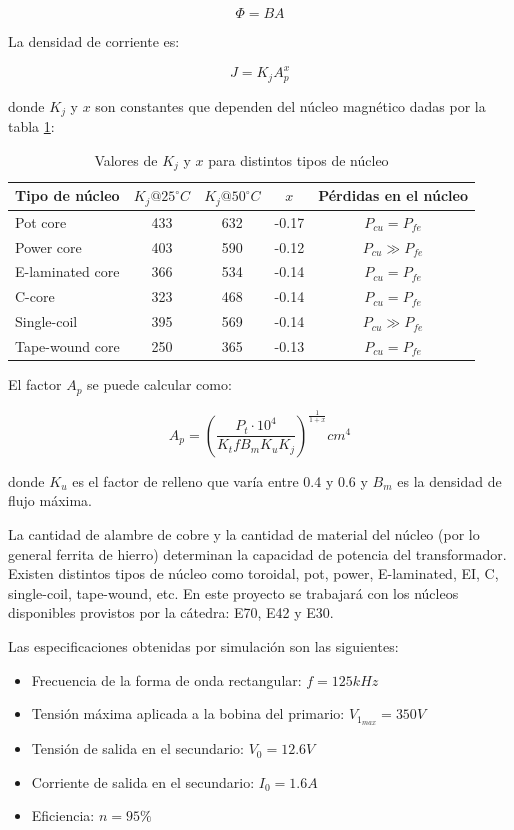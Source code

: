 $$ \Phi=BA $$

La densidad de corriente es:

$$ J=K_jA_p^x $$

donde $K_j$ y $x$ son constantes que dependen del núcleo magnético dadas por la tabla \ref{tabla:Kj}:

\begin{table}[]
    \begin{tabular}{lcccc}
        \hline
        Tipo de núcleo   & $K_j @ 25^{\circ} C$ & $K_j @ 50^{\circ} C$ & $x$   & Pérdidas en el núcleo \\ \hline
        Pot core         & 433                  & 632                  & -0.17 & $P_{cu}=P_{fe}$       \\
        Power core       & 403                  & 590                  & -0.12 & $P_{cu}\gg P_{fe}$    \\
        E-laminated core & 366                  & 534                  & -0.14 & $P_{cu}=P_{fe}$       \\
        C-core           & 323                  & 468                  & -0.14 & $P_{cu}=P_{fe}$       \\
        Single-coil      & 395                  & 569                  & -0.14 & $P_{cu}\gg P_{fe}$    \\
        Tape-wound core  & 250                  & 365                  & -0.13 & $P_{cu}=P_{fe}$       \\ \hline
    \end{tabular}
    \caption{Valores de $K_j$ y $x$ para distintos tipos de núcleo}
    \label{tabla:Kj}
\end{table}

El factor $A_{p}$ se puede calcular como: 

$$ A_{p}=\left(\frac{P_{t} \cdot 10^{4}}{K_{t} f B_{m} K_{u} K_{j}}\right)^{\frac{1}{1+x}} {cm}^{4} $$

donde $K_u$ es el factor de relleno que varía entre 0.4 y 0.6 y $B_m$ es la densidad de flujo máxima.

La cantidad de alambre de cobre y la cantidad de material del núcleo (por lo general ferrita de hierro) determinan la capacidad de potencia del transformador. 
Existen distintos tipos de núcleo como toroidal, pot, power, E-laminated, EI, C, single-coil, tape-wound, etc. 
En este proyecto se trabajará con los núcleos disponibles provistos por la cátedra: E70, E42 y E30. 

Las especificaciones obtenidas por simulación son las siguientes:
\begin{itemize}
    \item Frecuencia de la forma de onda rectangular: $f=125kHz$
    \item Tensión máxima aplicada a la bobina del primario: $V_{1_{max}}=350V$
    \item Tensión de salida en el secundario: $V_{0}=12.6V$
    \item Corriente de salida en el secundario: $I_{0}=1.6A$
    \item Eficiencia: $n=95\%$
\end{itemize}

